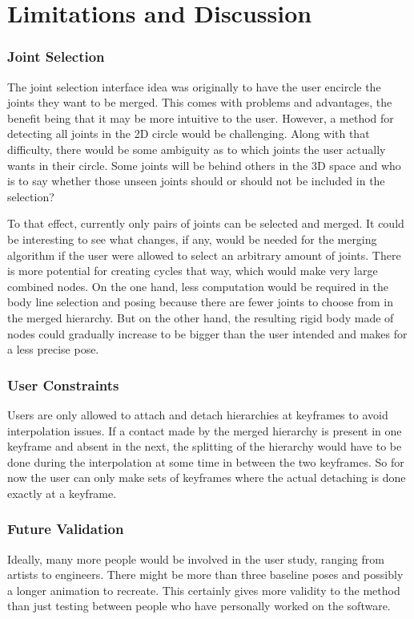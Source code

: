 \chapter{Limitations and Discussion}\label{chap:discussion}

\subsection{Joint Selection}
The joint selection interface idea was originally to have the user encircle the joints they want to be merged. This comes with problems and advantages, the benefit being that it may be more intuitive to the user. However, a method for detecting all joints in the 2D circle would be challenging. Along with that difficulty, there would be some ambiguity as to which joints the user actually wants in their circle. Some joints will be behind others in the 3D space and who is to say whether those unseen joints should or should not be included in the selection?

To that effect, currently only pairs of joints can be selected and merged. It could be interesting to see what changes, if any, would be needed for the merging algorithm if the user were allowed to select an arbitrary amount of joints. There is more potential for creating cycles that way, which would make very large combined nodes. On the one hand, less computation would be required in the body line selection and posing because there are fewer joints to choose from in the merged hierarchy. But on the other hand, the resulting rigid body made of nodes could gradually increase to be bigger than the user intended and makes for a less precise pose.

\subsection{User Constraints}
Users are only allowed to attach and detach hierarchies at keyframes to avoid interpolation issues. If a contact made by the merged hierarchy is present in one keyframe and absent in the next, the splitting of the hierarchy would have to be done during the interpolation at some time in between the two keyframes. So for now the user can only make sets of keyframes where the actual detaching is done exactly at a keyframe.

\subsection{Future Validation}
Ideally, many more people would be involved in the user study, ranging from artists to engineers. There might be more than three baseline poses and possibly a longer animation to recreate. This certainly gives more validity to the method than just testing between people who have personally worked on the software.